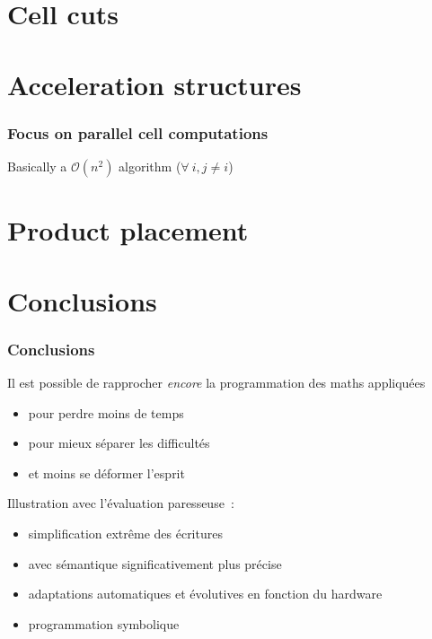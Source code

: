 \documentclass[aspectratio=169]{beamer}
\begin{document}
\section{Cell cuts}

\section{Acceleration structures}

\begin{frame}
    \frametitle{Focus on parallel cell computations}

    Basically a $\mathcal{O}( n^2 )$ algorithm ($\forall\ i, j \neq i$)
    
    
\end{frame}


\section{Product placement}


\section{Conclusions}

\begin{frame}
    \frametitle{Conclusions}

    Il est possible de rapprocher \textit{encore} la programmation des maths appliquées
    \begin{itemize}
        \item pour perdre moins de temps
        \item pour mieux séparer les difficultés
        \item et moins se déformer l'esprit
    \end{itemize}
    
    \vfill
    Illustration avec l'évaluation paresseuse~: 
    \begin{itemize}
        \item simplification extrême des écritures 
        \item avec sémantique significativement plus précise
        \item adaptations automatiques et évolutives en fonction du hardware
        \item programmation symbolique
    \end{itemize}
\end{frame}
\end{document}
